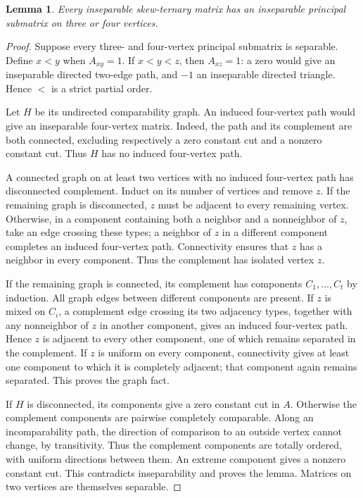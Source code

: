 \documentclass[11pt,a4paper]{amsart}
\numberwithin{equation}{section}
\theoremstyle{plain}
\newtheorem{lemma}[theorem]{Lemma}
\theoremstyle{definition}
\begin{document}
\begin{lemma}\label{lem:small-core}
Every inseparable skew-ternary matrix has an inseparable principal
submatrix on three or four vertices.
\end{lemma}
\begin{proof}
Suppose every three- and four-vertex principal submatrix is separable.
Define \(x<y\) when \(A_{xy}=1\).  If \(x<y<z\), then \(A_{xz}=1\):
a zero would give an inseparable directed two-edge path, and \(-1\) an
inseparable directed triangle.  Hence \(<\) is a strict partial order.

Let \(H\) be its undirected comparability graph.  An induced four-vertex
path would give an inseparable four-vertex matrix.  Indeed, the path and
its complement are both connected, excluding respectively a zero constant
cut and a nonzero constant cut.  Thus \(H\) has no induced four-vertex path.

A connected
graph on at least two vertices with no induced four-vertex path has
disconnected complement.  Induct on its number of vertices and remove
\(z\).  If the remaining graph is disconnected, \(z\) must be adjacent to
every remaining vertex.  Otherwise, in a component containing both a
neighbor and a nonneighbor of \(z\), take an edge crossing these types;
a neighbor of \(z\) in a different component completes an induced
four-vertex path.  Connectivity ensures that \(z\) has a neighbor in every
component.  Thus the complement has isolated vertex \(z\).

If the remaining graph is connected, its complement has components
\(C_1,\ldots,C_t\) by induction.  All graph edges between different
components are present.  If \(z\) is mixed on \(C_i\), a complement edge
crossing its two adjacency types, together with any nonneighbor of \(z\)
in another component, gives an induced four-vertex path.  Hence \(z\) is
adjacent to every other component, one of which remains separated in the
complement.  If \(z\) is uniform on every component, connectivity gives at
least one component to which it is completely adjacent; that component
again remains separated.  This proves the graph fact.

If \(H\) is disconnected, its components give a zero constant cut in \(A\).
Otherwise the complement components are pairwise completely comparable.
Along an incomparability path, the direction of comparison to an outside
vertex cannot change, by transitivity.  Thus the complement components
are totally ordered, with uniform directions between them.  An extreme
component gives a nonzero constant cut.  This contradicts inseparability
and proves the lemma.  Matrices on two vertices are themselves separable.
\end{proof}
\end{document}
